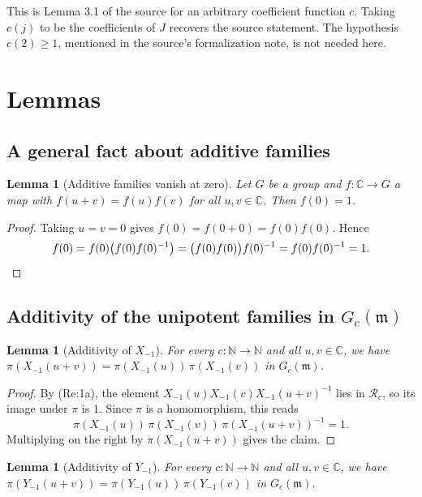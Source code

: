 \documentclass[11pt]{article}
\newtheorem{lemma}[theorem]{Lemma}
\theoremstyle{definition}
\theoremstyle{remark}
\newcommand{\Gc}{G_c(\mathfrak{m})}
\begin{document}
This is Lemma 3.1 of the source for an arbitrary coefficient function $c$. Taking $c(j)$ to be the coefficients of $J$ recovers the source statement. The hypothesis $c(2)\ge 1$, mentioned in the source's formalization note, is not needed here.

\section{Lemmas}

\subsection{A general fact about additive families}

\begin{lemma}[Additive families vanish at zero]\label{lem:add_zero_group_lemma}
Let $G$ be a group and $f\colon\mathbb{C}\to G$ a map with $f(u+v)=f(u)f(v)$ for all $u,v\in\mathbb{C}$. Then $f(0)=1$.
\end{lemma}

\begin{proof}
Taking $u=v=0$ gives $f(0)=f(0+0)=f(0)f(0)$. Hence
\[
f(0)=f(0)\big(f(0)f(0)^{-1}\big)=\big(f(0)f(0)\big)f(0)^{-1}=f(0)f(0)^{-1}=1.\qedhere
\]
\end{proof}

\subsection{Additivity of the unipotent families in $\Gc$}

\begin{lemma}[Additivity of $X_{-1}$]\label{lem:mk_xm_add}
For every $c\colon\mathbb{N}\to\mathbb{N}$ and all $u,v\in\mathbb{C}$, we have $\pi(X_{-1}(u+v))=\pi(X_{-1}(u))\,\pi(X_{-1}(v))$ in $\Gc$.
\end{lemma}

\begin{proof}
By (Re:1a), the element $X_{-1}(u)X_{-1}(v)X_{-1}(u+v)^{-1}$ lies in $\mathcal{R}_c$, so its image under $\pi$ is $1$. Since $\pi$ is a homomorphism, this reads
\[
\pi(X_{-1}(u))\,\pi(X_{-1}(v))\,\pi(X_{-1}(u+v))^{-1}=1.
\]
Multiplying on the right by $\pi(X_{-1}(u+v))$ gives the claim.
\end{proof}

\begin{lemma}[Additivity of $Y_{-1}$]\label{lem:mk_ym_add}
For every $c\colon\mathbb{N}\to\mathbb{N}$ and all $u,v\in\mathbb{C}$, we have $\pi(Y_{-1}(u+v))=\pi(Y_{-1}(u))\,\pi(Y_{-1}(v))$ in $\Gc$.
\end{lemma}
\end{document}
